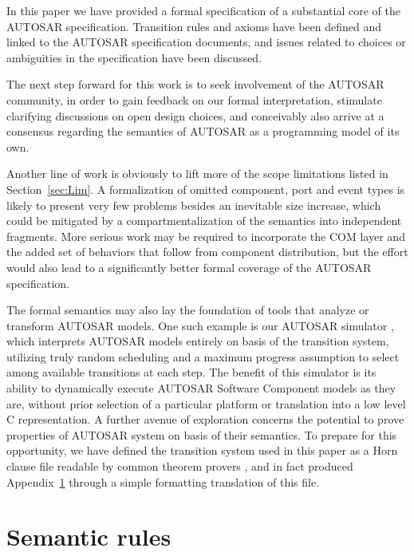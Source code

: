 \documentclass[10pt,conference]{IEEEtran}
\begin{document}
In this paper we have provided a formal specification of a substantial core of the AUTOSAR specification. Transition rules and axioms have been defined and linked to the AUTOSAR specification documents, and issues related to choices or ambiguities in the specification have been discussed.

The next step forward for this work is to seek involvement of the AUTOSAR community, in order to gain feedback on our formal interpretation, stimulate clarifying discussions on open design choices, and conceivably also arrive at a consensus regarding the semantics of AUTOSAR as a programming model of its own.

Another line of work is obviously to lift more of the scope limitations listed in Section~\ref{sec:Lim}. A formalization of omitted component, port and event types is likely to present very few problems besides an inevitable size increase, which could be mitigated by a compartmentalization of the semantics into independent fragments. More serious work may be required to incorporate the COM layer and the added set of behaviors that follow from component distribution, but the effort would also lead to a significantly better formal coverage of the AUTOSAR specification.

The formal semantics may also lay the foundation of tools that analyze or transform AUTOSAR models. One such example is our AUTOSAR simulator \cite{ARSim}, which interprets AUTOSAR models entirely on basis of the transition system, utilizing truly random scheduling and a maximum progress assumption to select among available transitions at each step. The benefit of this simulator is its ability to dynamically execute AUTOSAR Software Component models as they are, without prior selection of a particular platform or translation into a low level C representation. A further avenue of exploration concerns the potential to prove properties of AUTOSAR system on basis of their semantics. To prepare for this opportunity, we have defined the transition system used in this paper as a Horn clause file readable by common theorem provers \cite{AR.eprover}, and in fact produced Appendix~\ref{sec:Rules} through a simple formatting translation of this file.




\onecolumn
\appendix
\section{Semantic rules}
\label{sec:Rules}
\end{document}

